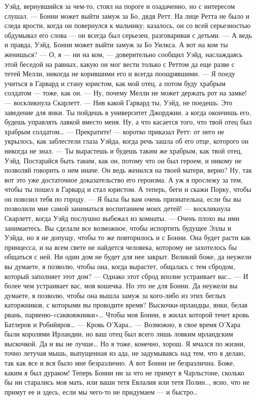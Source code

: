 Уэйд, вернувшийся за чем-то, стоял на пороге и озадаченно, но с интересом слушал.
— Бонни может выйти замуж за Бо, дядя Ретт. На лице Ретта не было и следа ярости, когда он повернулся к мальчику; казалось, он со всей серьезностью обдумывал его слова — он всегда был серьезен, разговаривая с детьми.
— А ведь и правда, Уэйд. Бонни может выйти замуж за Бо Уилкса. А вот на ком ты женишься?
— О, я — ни на ком, — доверительно сообщил Уэйд, наслаждаясь этой беседой на равных, какую он мог вести только с Реттом да еще разве с тетей Мелли, никогда не корившими его и всегда поощрявшими. — Я поеду учиться в Гарвард и стану юристом, как мой отец, а потом буду храбрым солдатом — тоже, как он.
— Ну, почему Мелли не может держать рот на замке! — воскликнула Скарлетт. — Нив какой Гарвард ты, Уэйд, не поедешь. Это заведение для янки. Ты пойдешь в университет Джорджии, а когда окончишь его, будешь управлять лавкой вместо меня. Ну, а что касается того, что твой отец был храбрым солдатом…
— Прекратите! — коротко приказал Ретт: от него не укрылось, как заблестели глаза Уэйда, когда речь зашла об его отце, которого он никогда не знал. — Ты вырастешь и будешь таким же храбрым, как твой отец, Уэйд. Постарайся быть таким, как он, потому что он был героем, и никому не позволяй говорить о нем иначе. Он ведь женился на твоей матери, верно? Ну, так вот это уже достаточное доказательство его героизма. А уж я прослежу за тем, чтобы ты пошел в Гарвард и стал юристом. А теперь, беги и скажи Порку, чтобы он повозил тебя по городу.
— Я была бы вам очень признательна, если бы вы позволили мне самой заниматься воспитанием моих детей! — воскликнула Скарлетт, когда Уэйд послушно выбежал из комнаты.
— Очень плохо вы ими занимаетесь. Вы сделали все возможное, чтобы испортить будущее Эллы и Уэйда, но я не допущу, чтобы то же повторилось и с Бонни. Она будет расти как принцесса, и на всем свете не найдется человека, которому не захотелось бы общаться с ней. Ни один дом не будет для нее закрыт. Великий боже, да неужели вы думаете, я позволю, чтобы она, когда вырастет, общалась с тем сбродом, который заполняет этот дом?
— Однако этот сброд вполне устраивает вас…
— И более чем устраивает вас, моя кошечка. Но это не для Бонни. Да неужели вы думаете, я позволю, чтобы она вышла замуж за кого-либо из этих беглых каторжников, с которыми вы проводите время? Выскочки-ирландцы, янки, белая рвань, парвеню-«саквояжники»… Чтобы моя Бонни, в жилах которой течет кровь Батлеров и Робийяров…
— Кровь О’Хара…
— Возможно, в свое время О’Хара были королями Ирландии, но ваш отец был всего лишь ловким ирландским выскочкой. Да и вы не лучше… Но я тоже, конечно, хорош. Я мчался по жизни, точно летучая мышь, выпущенная из ада, не задумываясь над тем, что я делаю, так как все и вся было мне безразлично. А вот Бонни не безразлична. Боже, каким я был дураком! Теперь Бонни ни за что не примут в Чарльстоне, сколько бы ни старались моя мать, или ваши тетя Евлалия или тетя Полин.., ясно, что не примут ее и здесь, если мы чего-то не придумаем — и быстро…
